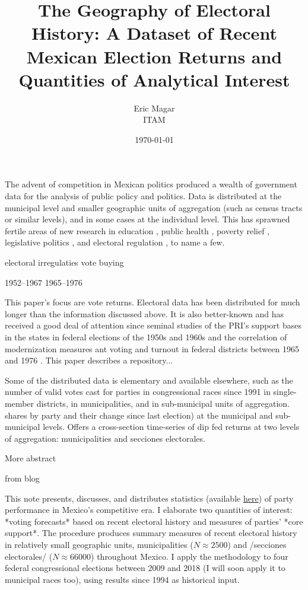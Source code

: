 \documentclass[letter,12pt]{article}
\begin{document}
\title{The Geography of Electoral History: A Dataset of Recent Mexican Election Returns and Quantities of Analytical Interest}
\author{Eric Magar \\ ITAM}
\date{\today}
\maketitle

\noindent The advent of competition in Mexican politics produced a wealth of government data for the analysis of public policy and politics. Data is distributed at the municipal level and smaller geographic units of aggregation (such as census tracts or similar levels), and in some cases at the individual level. This has sprawned fertile areas of new research in education \citep{hoyos.etal.Enlace.2012}, public health \citep{king.etal.segPop.2007, imai.king.nall.segPop.2009}, poverty relief \citep{diaz-estevez-magaloni-Poverty-book.2016, molinar.weldon.1994}, legislative politics \citep{rosas.langston.2011, cantuDesposatoMagar.MxRcv.2014}, and electoral regulation \citep{estevez.magar.rosas.2008}, to name a few.


electoral irregulaties \citep{cantuContiguas2014ajps}
vote buying \citep{cantuGroceries2019}

1952--1967
1965--1976

This paper's focus are vote returns. Electoral data has been distributed for much longer than the information discussed above. It is also better-known and has received a good deal of attention since seminal studies of the PRI's support bases in the states in federal elections of the 1950s and 1960s \citep{ames.1970} and the correlation of modernization measures ant voting and turnout in federal districts between 1965 and 1976 \citep{lehr.1985}. This paper describes a repository...

Some of the distributed data is elementary and available elsewhere, such as the number of valid votes cast for parties in congressional races since 1991 in single-member districts, in municipalities, and in sub-municipal units of aggregation.   shares by party and their change since last election) at the municipal and sub-municipal levels. Offers a cross-section time-series of dip fed returns at two levels of aggregation: municipalities and secciones electorales. 

More abstract

from blog

This note presents, discusses, and distributes statistics (available \href{https://github.com/emagar/mxDistritos}{here}) of party performance in Mexico's competitive era. I elaborate two quantities of interest: *voting forecasts* based on recent electoral history and measures of parties' *core support*. The procedure produces summary measures of recent electoral history in relatively small geographic units, municipalities ($N \approx 2500$) and /secciones electorales/ ($N \approx 66000$) throughout Mexico. I apply the methodology to four federal congressional elections between 2009 and 2018 (I will soon apply it to municipal races too), using results since 1994 as historical input.
\end{document}
